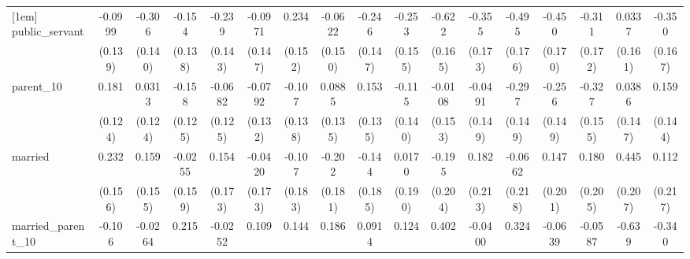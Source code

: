 {\begin{tabular}{l*{16}{c}}
[1em]
public\_servant      &     -0.0999         &      -0.306\sym{*}  &      -0.154         &      -0.239         &     -0.0971         &       0.234         &     -0.0622         &      -0.246         &      -0.253         &      -0.622\sym{***}&      -0.355\sym{*}  &      -0.495\sym{**} &      -0.450\sym{**} &      -0.311         &      0.0337         &      -0.350\sym{*}  \\
                    &     (0.139)         &     (0.140)         &     (0.138)         &     (0.143)         &     (0.147)         &     (0.152)         &     (0.150)         &     (0.147)         &     (0.155)         &     (0.165)         &     (0.173)         &     (0.176)         &     (0.170)         &     (0.172)         &     (0.161)         &     (0.167)         \\
[1em]
parent\_10           &       0.181         &      0.0313         &      -0.158         &     -0.0682         &     -0.0792         &      -0.107         &      0.0885         &       0.153         &      -0.115         &     -0.0108         &     -0.0491         &      -0.297\sym{*}  &      -0.256         &      -0.327\sym{*}  &      0.0386         &       0.159         \\
                    &     (0.124)         &     (0.124)         &     (0.125)         &     (0.125)         &     (0.132)         &     (0.138)         &     (0.135)         &     (0.135)         &     (0.140)         &     (0.153)         &     (0.149)         &     (0.149)         &     (0.149)         &     (0.155)         &     (0.147)         &     (0.144)         \\
[1em]
married             &       0.232         &       0.159         &     -0.0255         &       0.154         &     -0.0420         &      -0.107         &      -0.202         &      -0.144         &      0.0170         &      -0.195         &       0.182         &     -0.0662         &       0.147         &       0.180         &       0.445\sym{*}  &       0.112         \\
                    &     (0.156)         &     (0.155)         &     (0.159)         &     (0.173)         &     (0.173)         &     (0.183)         &     (0.181)         &     (0.185)         &     (0.190)         &     (0.204)         &     (0.213)         &     (0.218)         &     (0.201)         &     (0.205)         &     (0.207)         &     (0.217)         \\
[1em]
married\_parent\_10   &      -0.106         &     -0.0264         &       0.215         &     -0.0252         &       0.109         &       0.144         &       0.186         &      0.0914         &       0.124         &       0.402         &     -0.0400         &       0.324         &     -0.0639         &     -0.0587         &      -0.639\sym{**} &      -0.340         \\

\end{tabular}}

